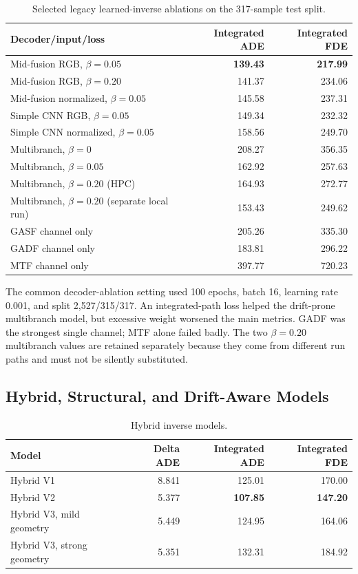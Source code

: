 \documentclass[12pt,a4paper,oneside]{report}
\begin{document}
\begin{table}[p]
\centering
\caption{Selected legacy learned-inverse ablations on the 317-sample test split.}
\label{tab:decoder-ablation}
\small
\begin{tabular}{L{0.55\textwidth}rr}
\toprule
Decoder/input/loss & Integrated ADE & Integrated FDE \\
\midrule
Mid-fusion RGB, $\beta=0.05$ & \textbf{139.43} & \textbf{217.99} \\
Mid-fusion RGB, $\beta=0.20$ & 141.37 & 234.06 \\
Mid-fusion normalized, $\beta=0.05$ & 145.58 & 237.31 \\
Simple CNN RGB, $\beta=0.05$ & 149.34 & 232.32 \\
Simple CNN normalized, $\beta=0.05$ & 158.56 & 249.70 \\
Multibranch, $\beta=0$ & 208.27 & 356.35 \\
Multibranch, $\beta=0.05$ & 162.92 & 257.63 \\
Multibranch, $\beta=0.20$ (HPC) & 164.93 & 272.77 \\
Multibranch, $\beta=0.20$ (separate local run) & 153.43 & 249.62 \\
GASF channel only & 205.26 & 335.30 \\
GADF channel only & 183.81 & 296.22 \\
MTF channel only & 397.77 & 720.23 \\
\bottomrule
\end{tabular}
\end{table}

The common decoder-ablation setting used 100 epochs, batch 16, learning rate 0.001, and split 2,527/315/317. An integrated-path loss helped the drift-prone multibranch model, but excessive weight worsened the main metrics. GADF was the strongest single channel; MTF alone failed badly. The two $\beta=0.20$ multibranch values are retained separately because they come from different run paths and must not be silently substituted.

\subsection{Hybrid, Structural, and Drift-Aware Models}

\begin{table}[htbp]
\centering
\caption{Hybrid inverse models.}
\label{tab:hybrid}
\begin{tabular}{lrrr}
\toprule
Model & Delta ADE & Integrated ADE & Integrated FDE \\
\midrule
Hybrid V1 & 8.841 & 125.01 & 170.00 \\
Hybrid V2 & 5.377 & \textbf{107.85} & \textbf{147.20} \\
Hybrid V3, mild geometry & 5.449 & 124.95 & 164.06 \\
Hybrid V3, strong geometry & 5.351 & 132.31 & 184.92 \\
\bottomrule
\end{tabular}
\end{table}
\end{document}
